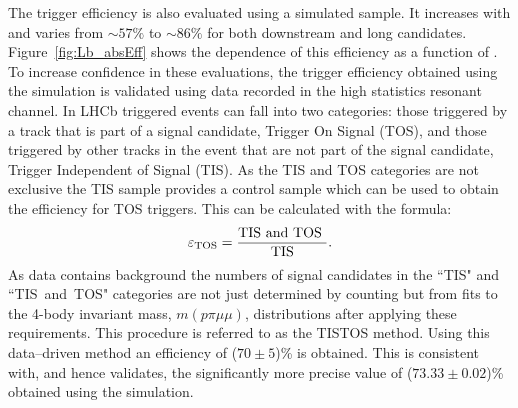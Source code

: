 The trigger efficiency is also evaluated using a simulated sample. It increases with \qsq and varies 
from $\sim 57\%$ to $\sim 86\%$ for both downstream and long candidates.
Figure~\ref{fig:Lb_absEff} shows the dependence of this efficiency as a function of \qsq.
To increase confidence in these evaluations, 
the trigger efficiency obtained using the simulation is validated using data recorded in the high statistics resonant channel.
In LHCb triggered events can fall into two categories: those triggered by a track that is part of a signal candidate, 
Trigger On Signal (TOS), and those triggered by other tracks in the event that are not part of the signal candidate, 
Trigger Independent of Signal (TIS). As the TIS and TOS categories are not exclusive the TIS sample provides a control
sample which can be used to obtain the efficiency for TOS triggers. This can be calculated with the formula:
\begin{equation}
\varepsilon_{\rm TOS} = \frac{\text{TIS  and TOS }}{\text{TIS}}.
\end{equation}
As data contains background the numbers of signal candidates in the ``TIS" and \mbox{``TIS and TOS"}
categories are not just determined by counting but from fits to the 4-body invariant mass, 
$m(p\pi\mu\mu)$, distributions after applying these requirements. This procedure is referred to as the TISTOS method. 
Using this data--driven method an efficiency of ($70 \pm 5$)\% is obtained. This is consistent with, and hence validates, 
the significantly more precise value of ($73.33 \pm 0.02$)\% obtained using the simulation.
%

